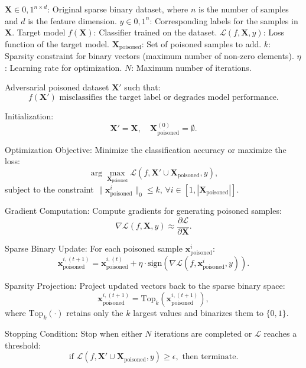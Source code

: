 
$\mathbf{X} \in {0,1}^{n \times d}$: Original sparse binary dataset, where $n$ is the number of samples and $d$ is the feature dimension.
$y \in {0,1}^n$: Corresponding labels for the samples in $\mathbf{X}$.
Target model $f(\mathbf{X})$: Classifier trained on the dataset.
$\mathcal{L}(f, \mathbf{X}, y)$: Loss function of the target model.
$\mathbf{X}_{\text{poisoned}}$: Set of poisoned samples to add.
$k$: Sparsity constraint for binary vectors (maximum number of non-zero elements).
$\eta$: Learning rate for optimization.
$N$: Maximum number of iterations.

Adversarial poisoned dataset $\mathbf{X}'$ such that:
\[
f(\mathbf{X}') \text{ misclassifies the target label or degrades model performance}.
\]

Initialization:
    \[
    \mathbf{X}' = \mathbf{X}, \quad \mathbf{X}_{\text{poisoned}}^{(0)} = \emptyset.
    \]
    
    Optimization Objective: Minimize the classification accuracy or maximize the loss:
    \[
    \arg \max_{\mathbf{X}_{\text{poisoned}}} \mathcal{L}(f, \mathbf{X}' \cup \mathbf{X}_{\text{poisoned}}, y),
    \]
    subject to the constraint $\|\mathbf{x}_{\text{poisoned}}^i\|_0 \leq k$, $\forall i \in [1, |\mathbf{X}_{\text{poisoned}}|]$.
    
    Gradient Computation: Compute gradients for generating poisoned samples:
    \[
    \nabla \mathcal{L}(f, \mathbf{X}, y) \approx \frac{\partial \mathcal{L}}{\partial \mathbf{X}}.
    \]
    
    Sparse Binary Update: For each poisoned sample $\mathbf{x}_{\text{poisoned}}^i$:
    \[
    \mathbf{x}_{\text{poisoned}}^{i,(t+1)} = \mathbf{x}_{\text{poisoned}}^{i,(t)} + \eta \cdot \text{sign}\left(\nabla \mathcal{L}(f, \mathbf{x}_{\text{poisoned}}^i, y)\right).
    \]
    
    Sparsity Projection: Project updated vectors back to the sparse binary space:
    \[
    \mathbf{x}_{\text{poisoned}}^{i,(t+1)} = \text{Top}_k\left(\mathbf{x}_{\text{poisoned}}^{i,(t+1)}\right),
    \]
    where $\text{Top}_k(\cdot)$ retains only the $k$ largest values and binarizes them to $\{0,1\}$.
    
    Stopping Condition: Stop when either $N$ iterations are completed or $\mathcal{L}$ reaches a threshold:
    \[
    \text{if } \mathcal{L}(f, \mathbf{X}' \cup \mathbf{X}_{\text{poisoned}}, y) \geq \epsilon, \text{ then terminate.}
    \]

